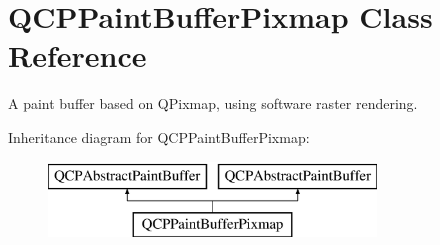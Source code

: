 \hypertarget{class_q_c_p_paint_buffer_pixmap}{}\section{Q\+C\+P\+Paint\+Buffer\+Pixmap Class Reference}
\label{class_q_c_p_paint_buffer_pixmap}


A paint buffer based on Q\+Pixmap, using software raster rendering.  


Inheritance diagram for Q\+C\+P\+Paint\+Buffer\+Pixmap\+:\begin{figure}[H]
\begin{center}
\leavevmode
\includegraphics[height=2.000000cm]{class_q_c_p_paint_buffer_pixmap}
\end{center}
\end{figure}
